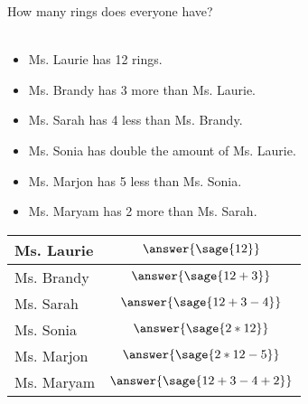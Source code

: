 \documentclass{ximera}
\begin{document}
\begin{problem}
How many rings does everyone have?
\\
\\
\begin{minipage}[c]{0.5\textwidth}
\begin{itemize}
    \item Ms. Laurie has 12 rings. 
    \item Ms. Brandy has 3 more than Ms. Laurie.
    \item Ms. Sarah has 4 less than Ms. Brandy.
    \item Ms. Sonia has double the amount of Ms. Laurie.
    \item Ms. Marjon has 5 less than Ms. Sonia.
    \item Ms. Maryam has 2 more than Ms. Sarah.
\end{itemize}
\end{minipage}
\hfill
\begin{minipage}[c]{0.3\textwidth}
\setlength\extrarowheight{12pt}
\begin{tabular}{|l|c|}
\hline 
Ms. Laurie &  $\answer{\sage{12}}$\\
\hline 
Ms. Brandy &  $\answer{\sage{12+3}}$\\
\hline
Ms. Sarah &  $\answer{\sage{12+3-4}}$\\
\hline
Ms. Sonia &  $\answer{\sage{2*12}}$\\
\hline
Ms. Marjon &  $\answer{\sage{2*12-5}}$\\
\hline
Ms. Maryam &  $\answer{\sage{12+3-4+2}}$\\
\hline
\end{tabular}
\end{minipage}
\end{problem}
\end{document}
